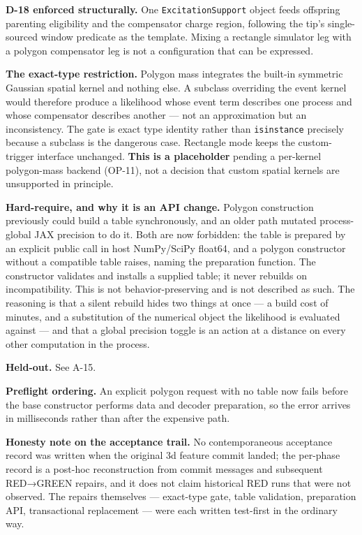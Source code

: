 \documentclass[
  10pt,
]{article}
\begin{document}
\textbf{D-18 enforced structurally.} One \texttt{ExcitationSupport} object feeds offspring parenting eligibility and the compensator charge region, following the tip's single-sourced window predicate as the template. Mixing a rectangle simulator leg with a polygon compensator leg is not a configuration that can be expressed.

\textbf{The exact-type restriction.} Polygon mass integrates the built-in symmetric Gaussian spatial kernel and nothing else. A subclass overriding the event kernel would therefore produce a likelihood whose event term describes one process and whose compensator describes another --- not an approximation but an inconsistency. The gate is exact type identity rather than \texttt{isinstance} precisely because a subclass is the dangerous case. Rectangle mode keeps the custom-trigger interface unchanged. \textbf{This is a placeholder} pending a per-kernel polygon-mass backend (OP-11), not a decision that custom spatial kernels are unsupported in principle.

\textbf{Hard-require, and why it is an API change.} Polygon construction previously could build a table synchronously, and an older path mutated process-global JAX precision to do it. Both are now forbidden: the table is prepared by an explicit public call in host NumPy/SciPy float64, and a polygon constructor without a compatible table raises, naming the preparation function. The constructor validates and installs a supplied table; it never rebuilds on incompatibility. This is not behavior-preserving and is not described as such. The reasoning is that a silent rebuild hides two things at once --- a build cost of minutes, and a substitution of the numerical object the likelihood is evaluated against --- and that a global precision toggle is an action at a distance on every other computation in the process.

\textbf{Held-out.} See A-15.

\textbf{Preflight ordering.} An explicit polygon request with no table now fails before the base constructor performs data and decoder preparation, so the error arrives in milliseconds rather than after the expensive path.

\textbf{Honesty note on the acceptance trail.} No contemporaneous acceptance record was written when the original 3d feature commit landed; the per-phase record is a post-hoc reconstruction from commit messages and subsequent RED→GREEN repairs, and it does not claim historical RED runs that were not observed. The repairs themselves --- exact-type gate, table validation, preparation API, transactional replacement --- were each written test-first in the ordinary way.
\end{document}
